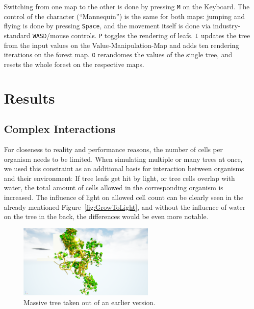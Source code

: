 \documentclass[11pt, abstract=on]{scrartcl}
\begin{document}
Switching from one map to the other is done by pressing \texttt{M} on the Keyboard. The control of the character (``Mannequin'') is the same for both maps: jumping and flying is done by pressing \texttt{Space}, and the movement itself is done via industry-standard \texttt{WASD}/mouse controls. \texttt{P} toggles the rendering of leafs. \texttt{I} updates the tree from the input values on the Value-Manipulation-Map and adds ten rendering iterations on the forest map. \texttt{O} rerandomes the values of the single tree, and resets the whole forest on the respective maps.


\section{Results}
\subsection{Complex Interactions}

For closeness to reality and performance reasons, the number of cells per organism needs to be limited. When simulating multiple or many trees at once, we used this constraint as an additional basis for interaction between organisms and their environment: If tree leafs get hit by light, or tree cells overlap with water, the total amount of cells allowed in the corresponding organism is increased. The influence of light on allowed cell count can be clearly seen in the already mentioned Figure~\ref{fig:GrowToLight}, and without the influence of water on the tree in the back, the differences would be even more notable.

\begin{figure}
 	 \centering
 	    \includegraphics[width=0.6\textwidth]{SS_BIGTree.png}
 	 \caption{Massive tree taken out of an earlier version.}
 	 \label{fig:BIGTree}
\end{figure}
\end{document}
